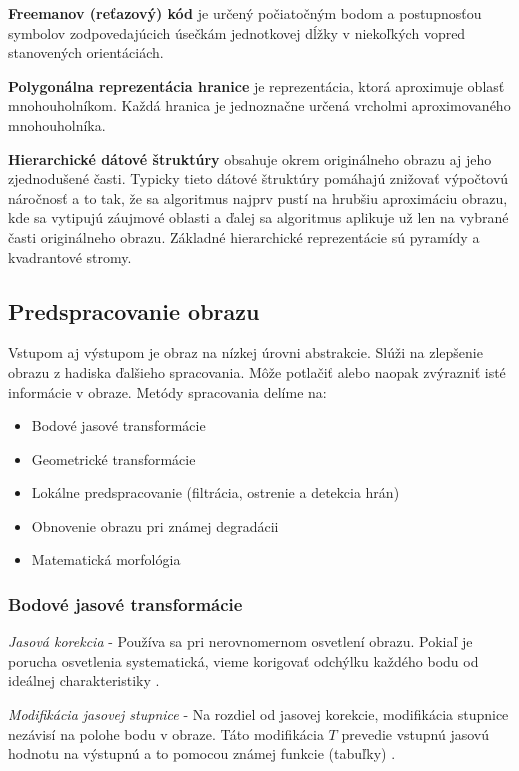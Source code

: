 \begin{itemize}
\textbf{Freemanov (reťazový) kód}  je určený počiatočným bodom a postupnosťou symbolov zodpovedajúcich úsečkám jednotkovej dĺžky v niekoľkých vopred stanovených orientáciách. 

\textbf{Polygonálna reprezentácia hranice} je reprezentácia, ktorá aproximuje oblasť mnohouholníkom. Každá hranica je jednoznačne určená vrcholmi aproximovaného mnohouholníka.

\textbf{Hierarchické dátové štruktúry} obsahuje okrem originálneho obrazu aj jeho zjednodušené časti. Typicky tieto dátové štruktúry pomáhajú znižovať výpočtovú náročnosť a to tak, že sa algoritmus najprv pustí na hrubšiu aproximáciu obrazu, kde sa vytipujú záujmové oblasti a ďalej sa algoritmus aplikuje už len na vybrané časti originálneho obrazu. Základné hierarchické reprezentácie sú pyramídy a kvadrantové stromy. 

\end{itemize}



\subsection{Predspracovanie obrazu}
Vstupom aj výstupom je obraz na nízkej úrovni abstrakcie. Slúži na zlepšenie obrazu z hadiska ďalšieho spracovania. Môže potlačiť alebo naopak zvýrazniť isté informácie v obraze.\cite{pocitacove_videnie_v_praxi} Metódy spracovania delíme na: 
\begin{itemize}
\item Bodové jasové transformácie
\item Geometrické transformácie
\item Lokálne predspracovanie (filtrácia, ostrenie a detekcia hrán)
\item Obnovenie obrazu pri známej degradácii 
\item Matematická morfológia 
\end{itemize}

\subsubsection{Bodové jasové transformácie}

\textit{Jasová korekcia} - Používa sa pri nerovnomernom osvetlení obrazu. Pokiaľ je porucha
osvetlenia systematická, vieme korigovať odchýlku každého bodu od ideálnej charakteristiky \cite{pocitacove_videnie_v_praxi}.

\textit{Modifikácia jasovej stupnice} - Na rozdiel od jasovej korekcie, modifikácia stupnice nezávisí na polohe bodu v obraze. Táto modifikácia $T$ prevedie vstupnú jasovú hodnotu na výstupnú a to pomocou známej funkcie (tabuľky) \cite{pocitacove_videnie_v_praxi}. 



